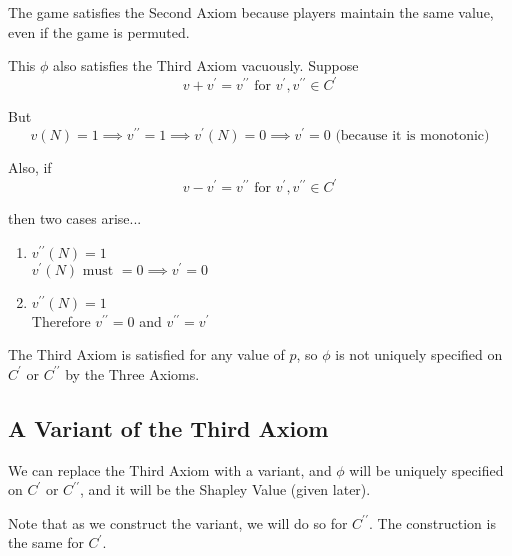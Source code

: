 \documentclass[
paper=128mm:96mm, %
fontsize=11pt, %
pagesize, %
parskip=half-, %
]{scrartcl} %
\theoremstyle{mythmstyle} %
\begin{document}
The game satisfies the Second Axiom because players maintain the same value, even if the game is permuted.

\clearpage

This $\phi$ also satisfies the Third Axiom vacuously. Suppose
	\[ v + v^{\prime} = v^{\prime\prime} \text{ for } v^{\prime}, v^{\prime\prime} \in C^{\prime} \]
    
But
	\[v(N) = 1 \implies v^{\prime\prime} = 1 \implies v^{\prime}(N) = 0 \implies v^{\prime} = 0 \text{ (because it is monotonic)}\]

Also, if 
	\[ v - v^{\prime} = v^{\prime\prime} \text{ for } v^{\prime}, v^{\prime\prime} \in C^{\prime} \]

then two cases arise...

\clearpage

\begin{enumerate}
\item $v^{\prime\prime}(N) = 1$ \\
$v^{\prime}(N) \text{ must } = 0 \implies v^{\prime} = 0$

\item $v^{\prime\prime}(N) = 1$ \\
Therefore $v^{\prime\prime} = 0$ and $v^{\prime\prime} = v^{\prime}$
\end{enumerate}

The Third Axiom is satisfied for any value of $p$, so $\phi$ is not uniquely specified on $C^{\prime}$ or $C^{\prime\prime}$ by the Three Axioms.

\clearpage

\subsection{A Variant of the Third Axiom}

We can replace the Third Axiom with a variant, and  $\phi$ will be uniquely specified on $C^{\prime}$ or $C^{\prime\prime}$, and it will be the Shapley Value (given later).

Note that as we construct the variant, we will do so for $C^{\prime\prime}$. The construction is the same for $C^{\prime}$.

\clearpage
\end{document}

